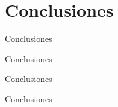 %
%
%

\section{Conclusiones}

\begin{frame}{Conclusiones}
  
  Conclusiones


\end{frame}

\begin{frame}{Conclusiones}
  
  Conclusiones


\end{frame}

